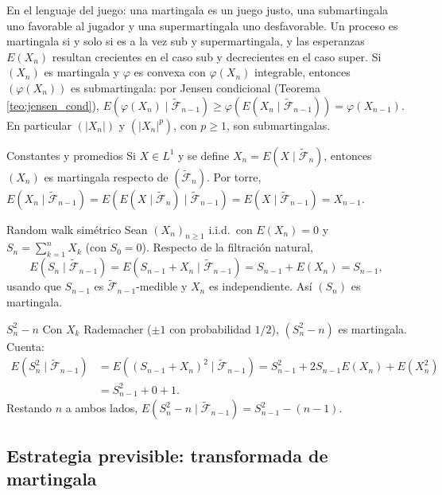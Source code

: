 \documentclass[11pt, a4paper]{article}
\begin{document}
\obs En el lenguaje del juego: una martingala es un juego justo, una submartingala uno
favorable al jugador y una supermartingala uno desfavorable. Un proceso es martingala si y
solo si es a la vez sub y supermartingala, y las esperanzas $E(X_n)$ resultan crecientes en el
caso sub y decrecientes en el caso super. Si $(X_n)$ es martingala y $\varphi$ es convexa con
$\varphi(X_n)$ integrable, entonces $(\varphi(X_n))$ es submartingala: por Jensen condicional
(Teorema \ref{teo:jensen_cond}),
$E(\varphi(X_n) \mid \widetilde{\mathcal{F}}_{n-1}) \ge
\varphi(E(X_n \mid \widetilde{\mathcal{F}}_{n-1})) = \varphi(X_{n-1})$. En particular
$(|X_n|)$ y $(|X_n|^p)$, con $p \ge 1$, son submartingalas.

\begin{ejemplo}{Constantes y promedios}{}
Si $X \in L^1$ y se define $X_n = E(X \mid \widetilde{\mathcal{F}}_n)$, entonces $(X_n)$ es
martingala respecto de $(\widetilde{\mathcal{F}}_n)$. Por torre,
$E(X_n \mid \widetilde{\mathcal{F}}_{n-1}) = E(E(X \mid \widetilde{\mathcal{F}}_n) \mid
\widetilde{\mathcal{F}}_{n-1}) = E(X \mid \widetilde{\mathcal{F}}_{n-1}) = X_{n-1}$.
\end{ejemplo}

\begin{ejemplo}{Random walk simétrico}{}
Sean $(X_n)_{n \ge 1}$ i.i.d.\ con $E(X_n) = 0$ y $S_n = \sum_{k=1}^n X_k$ (con $S_0 = 0$).
Respecto de la filtración natural,
$$ E(S_n \mid \widetilde{\mathcal{F}}_{n-1}) = E(S_{n-1} + X_n \mid \widetilde{\mathcal{F}}_{n-1})
= S_{n-1} + E(X_n) = S_{n-1}, $$
usando que $S_{n-1}$ es $\widetilde{\mathcal{F}}_{n-1}$-medible y $X_n$ es independiente. Así
$(S_n)$ es martingala.
\end{ejemplo}

\begin{ejemplo}{$S_n^2 - n$}{}
Con $X_k$ Rademacher ($\pm 1$ con probabilidad $1/2$), $(S_n^2 - n)$ es martingala. Cuenta:
\begin{align*}
E(S_n^2 \mid \widetilde{\mathcal{F}}_{n-1}) &= E((S_{n-1} + X_n)^2 \mid
\widetilde{\mathcal{F}}_{n-1})
= S_{n-1}^2 + 2 S_{n-1} E(X_n) + E(X_n^2) \\
&= S_{n-1}^2 + 0 + 1.
\end{align*}
Restando $n$ a ambos lados, $E(S_n^2 - n \mid \widetilde{\mathcal{F}}_{n-1}) = S_{n-1}^2 - (n-1)$.
\end{ejemplo}

\subsection{Estrategia previsible: transformada de martingala}
\end{document}
